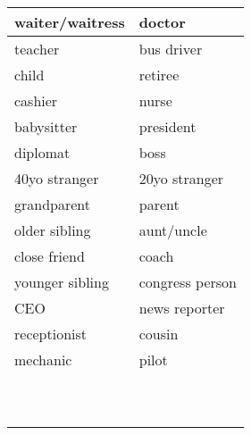 \documentclass{article}
\date{}
\begin{document}
  \centering
  \noindent
  {\LARGE
    \begin{tabular}{| p{} | p{} |}
      \hline
      waiter/waitress  & doctor \\
      \hline
      teacher          & bus driver \\
      \hline
      child            & retiree \\
      \hline
      cashier          & nurse \\
      \hline
      babysitter       & president \\
      \hline
      diplomat         & boss \\
      \hline
      40yo stranger    & 20yo stranger \\
      \hline
      grandparent      & parent \\
      \hline
      older sibling    & aunt/uncle \\
      \hline
      close friend     & coach \\
      \hline
      younger sibling  & congress person \\
      \hline
      CEO              & news reporter \\
      \hline
      receptionist     & cousin \\
      \hline
      mechanic         & pilot \\
      \hline
                       & \\
      \hline
                       & \\
      \hline
                       & \\
      \hline
                       & \\
      \hline
                       & \\
      \hline
                       & \\
      \hline
                       & \\
      \hline
                       & \\
      \hline
                       & \\
      \hline
                       & \\
      \hline
    \end{tabular}
  }
\end{document}

